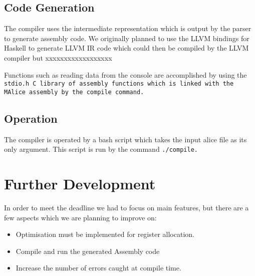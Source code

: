 \documentclass[11pt]{article}
\begin{document}
\subsection{Code Generation}
The compiler uses the intermediate representation which is output by the parser to generate assembly code. We originally planned to use the LLVM bindings for Haskell to generate LLVM IR code which could then be compiled by the LLVM compiler but xxxxxxxxxxxxxxxxxx

Functions such as reading data from the console are accomplished by using the \tt stdio.h \rm C library of assembly functions which is linked with the MAlice assembly by the \tt compile \rm command.

\subsection{Operation}
The compiler is operated by a bash script which takes the input alice file as its only argument. This script is run by the command \tt ./compile\rm .

\section{Further Development}
In order to meet the deadline we had to focus on main features, but there are a few aspects which we are planning to improve on:

\begin{itemize}
\item Optimisation must be implemented for register allocation.
\item Compile and run the generated Assembly code
\item Increase the number of errors caught at compile time.
\end{itemize}
\end{document}
